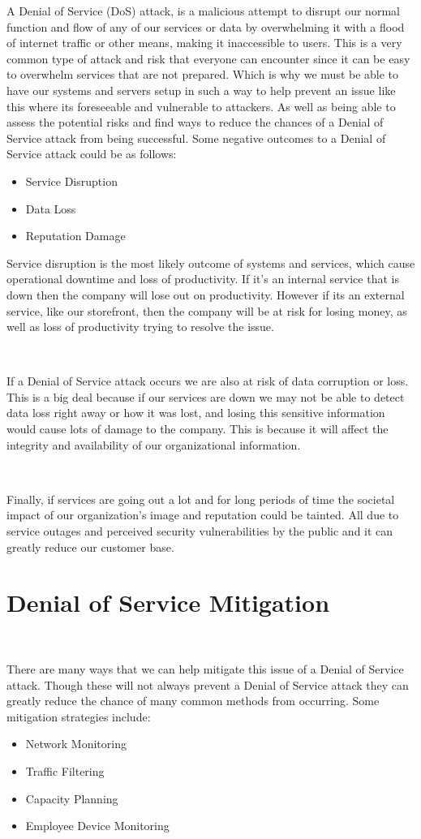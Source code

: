 \documentclass[12pt,a4paper]{report}
\begin{document}
A Denial of Service (DoS) attack, is a malicious attempt to disrupt our normal function and flow of any of our services or data by overwhelming it with a flood of internet traffic or other means, making it inaccessible to users.
This is a very common type of attack and risk that everyone can encounter since it can be easy to overwhelm services that are not prepared.
Which is why we must be able to have our systems and servers setup in such a way to help prevent an issue like this where its foreseeable and vulnerable to attackers.
As well as being able to assess the potential risks and find ways to reduce the chances of a Denial of Service attack from being successful.
Some negative outcomes to a Denial of Service attack could be as follows:
\begin{itemize}
 \item Service Disruption
 \item Data Loss
 \item Reputation Damage
\end{itemize}

Service disruption is the most likely outcome of systems and services, which cause operational downtime and loss of productivity.
If it's an internal service that is down then the company will lose out on productivity.
However if its an external service, like our storefront, then the company will be at risk for losing money, as well as loss of productivity trying to resolve the issue.

\

If a Denial of Service attack occurs we are also at risk of data corruption or loss.
This is a big deal because if our services are down we may not be able to detect data loss right away or how it was lost, and losing this sensitive information would cause lots of damage to the company. 
This is because it will affect the integrity and availability of our organizational information.

\

Finally, if services are going out a lot and for long periods of time the societal impact of our organization's image and reputation could be tainted.
All due to service outages and perceived security vulnerabilities by the public and it can greatly reduce our customer base.

\section{Denial of Service Mitigation}
\

There are many ways that we can help mitigate this issue of a Denial of Service attack. 
Though these will not always prevent a Denial of Service attack they can greatly reduce the chance of many common methods from occurring.
Some mitigation strategies include:
\begin{itemize}
 \item Network Monitoring
 \item Traffic Filtering
 \item Capacity Planning
 \item Employee Device Monitoring
\end{itemize}
\end{document}
